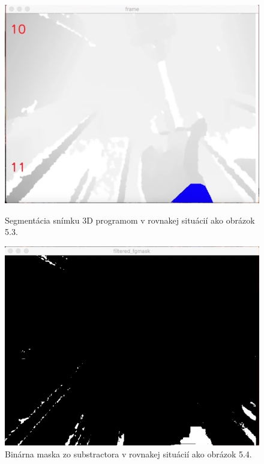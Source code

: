 \begin{figure}[H]
  \centering
  \begin{minipage}[b]{0.48\textwidth}
    \includegraphics[width=\textwidth]{images/handCard_3D}
    \caption{Segmentácia snímku 3D programom v rovnakej situácií ako obrázok 5.3.}
  \end{minipage}
  \hfill
  \begin{minipage}[b]{0.48\textwidth}
    \includegraphics[width=\textwidth]{images/handCard_fmask_3D}
    \caption{Binárna maska zo substractora  v rovnakej situácií ako obrázok 5.4.}
  \end{minipage}
\end{figure}  

